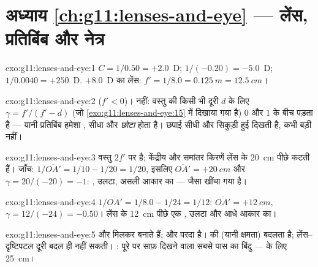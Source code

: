 \section*{अध्याय \ref{ch:g11:lenses-and-eye} --- लेंस, प्रतिबिंब और नेत्र}

\begin{solution}{exo:g11:lenses-and-eye:1}
$C = 1/0.50 = +2.0$~D; $1/(-0.20) = -5.0$~D; $1/0.0040 = +250$~D. $+8.0$~D का लेंस: $f' = 1/8.0 = \qty{0.125}{m} = \qty{12.5}{cm}$।
\end{solution}

\begin{solution}{exo:g11:lenses-and-eye:2}
 ($f' < 0$)। नहीं: वस्तु की किसी भी दूरी $d$ के लिए
$\gamma = f'/(f' - d)$ (जो \cref{exo:g11:lenses-and-eye:15} में दिखाया गया है) $0$ और $1$ के बीच पड़ता है
--- यानी प्रतिबिंब हमेशा , सीधा और \emph{छोटा} होता है।
छपाई सीधी और सिकुड़ी हुई दिखती है, कभी बड़ी नहीं।
\end{solution}

\begin{solution}{exo:g11:lenses-and-eye:3}
वस्तु $2f'$ पर है; केंद्रीय और समांतर किरणें लेंस के \qty{20}{cm}
पीछे कटती हैं। जाँच: $1/\overline{OA'} = 1/10 - 1/20 = 1/20$, इसलिए $\overline{OA'} = +\qty{20}{cm}$ और $\gamma = 20/(-20) = -1$: ,
उलटा, असली आकार का --- जैसा खींचा गया है।
\end{solution}

\begin{solution}{exo:g11:lenses-and-eye:4}
$1/\overline{OA'} = 1/8.0 - 1/24 = 1/12$: $\overline{OA'} = +\qty{12}{cm}$, $\gamma = 12/(-24) = -0.50$। लेंस के \qty{12}{cm} पीछे एक , उलटा और आधे आकार का।
\end{solution}

\begin{solution}{exo:g11:lenses-and-eye:5}
 और  मिलकर  बनाते
हैं; और  परदा है।   की
 (यानी क्षमता) बदलता है; लेंस--दृष्टिपटल दूरी
बदल ही नहीं सकती। : पूरे  पर साफ़ दिखने
वाला सबसे पास का बिंदु ---  के लिए \qty{25}{cm}।
\end{solution}

